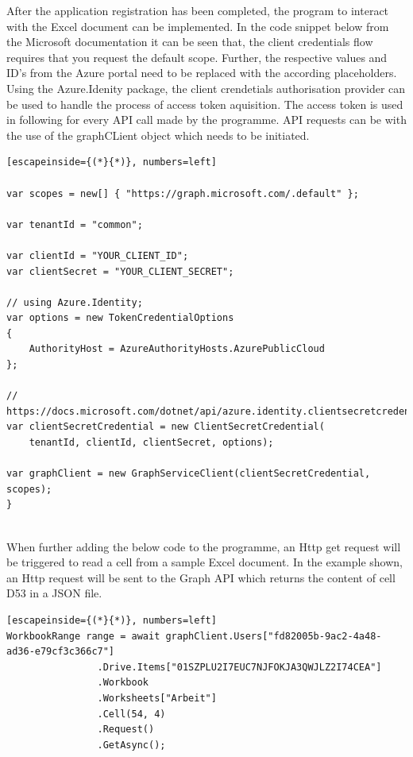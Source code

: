 After the application registration has been completed, the program to interact with the Excel document can be implemented. In the code snippet below from the Microsoft documentation it can be seen that, the client credentials flow requires that you request the default scope. Further, the respective values and ID's from the Azure portal need to be replaced with the according placeholders. Using the Azure.Idenity package, the client crendetials authorisation provider can be used to handle the process of access token aquisition. The access token is used in following for every API call made by the programme. API requests can be with the use of the graphCLient object which needs to be initiated.



\begin{lstlisting}[escapeinside={(*}{*)}, numbers=left]

var scopes = new[] { "https://graph.microsoft.com/.default" };

var tenantId = "common";

var clientId = "YOUR_CLIENT_ID";
var clientSecret = "YOUR_CLIENT_SECRET";

// using Azure.Identity;
var options = new TokenCredentialOptions
{
    AuthorityHost = AzureAuthorityHosts.AzurePublicCloud
};

// https://docs.microsoft.com/dotnet/api/azure.identity.clientsecretcredential
var clientSecretCredential = new ClientSecretCredential(
    tenantId, clientId, clientSecret, options);
    
var graphClient = new GraphServiceClient(clientSecretCredential, scopes);
} 
\end{lstlisting}\\

When further adding the below code to the programme, an Http get request will be triggered to read a cell from a sample Excel document. In the example shown, an Http request will be sent to the Graph API which returns the content of cell D53 in a JSON file.  


\begin{lstlisting}[escapeinside={(*}{*)}, numbers=left]
WorkbookRange range = await graphClient.Users["fd82005b-9ac2-4a48-ad36-e79cf3c366c7"]
                .Drive.Items["01SZPLU2I7EUC7NJFOKJA3QWJLZ2I74CEA"]
                .Workbook
                .Worksheets["Arbeit"]
                .Cell(54, 4)
                .Request()
                .GetAsync();
\end{lstlisting}\\

